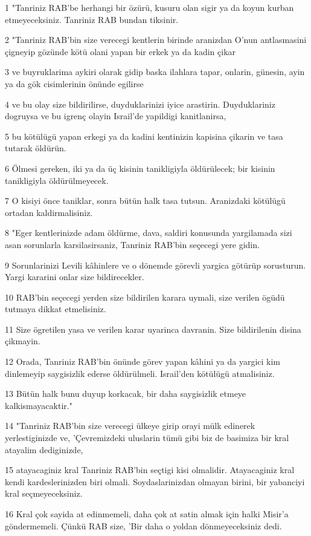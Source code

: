 \par 1 "Tanriniz RAB'be herhangi bir özürü, kusuru olan sigir ya da koyun kurban etmeyeceksiniz. Tanriniz RAB bundan tiksinir.
\par 2 "Tanriniz RAB'bin size verecegi kentlerin birinde aranizdan O'nun antlasmasini çigneyip gözünde kötü olani yapan bir erkek ya da kadin çikar
\par 3 ve buyruklarima aykiri olarak gidip baska ilahlara tapar, onlarin, günesin, ayin ya da gök cisimlerinin önünde egilirse
\par 4 ve bu olay size bildirilirse, duyduklarinizi iyice arastirin. Duyduklariniz dogruysa ve bu igrenç olayin Israil'de yapildigi kanitlanirsa,
\par 5 bu kötülügü yapan erkegi ya da kadini kentinizin kapisina çikarin ve tasa tutarak öldürün.
\par 6 Ölmesi gereken, iki ya da üç kisinin tanikligiyla öldürülecek; bir kisinin tanikligiyla öldürülmeyecek.
\par 7 O kisiyi önce taniklar, sonra bütün halk tasa tutsun. Aranizdaki kötülügü ortadan kaldirmalisiniz.
\par 8 "Eger kentlerinizde adam öldürme, dava, saldiri konusunda yargilamada sizi asan sorunlarla karsilasirsaniz, Tanriniz RAB'bin seçecegi yere gidin.
\par 9 Sorunlarinizi Levili kâhinlere ve o dönemde görevli yargica götürüp sorusturun. Yargi kararini onlar size bildirecekler.
\par 10 RAB'bin seçecegi yerden size bildirilen karara uymali, size verilen ögüdü tutmaya dikkat etmelisiniz.
\par 11 Size ögretilen yasa ve verilen karar uyarinca davranin. Size bildirilenin disina çikmayin.
\par 12 Orada, Tanriniz RAB'bin önünde görev yapan kâhini ya da yargici kim dinlemeyip saygisizlik ederse öldürülmeli. Israil'den kötülügü atmalisiniz.
\par 13 Bütün halk bunu duyup korkacak, bir daha saygisizlik etmeye kalkismayacaktir."
\par 14 "Tanriniz RAB'bin size verecegi ülkeye girip orayi mülk edinerek yerlestiginizde ve, 'Çevremizdeki uluslarin tümü gibi biz de basimiza bir kral atayalim dediginizde,
\par 15 atayacaginiz kral Tanriniz RAB'bin seçtigi kisi olmalidir. Atayacaginiz kral kendi kardeslerinizden biri olmali. Soydaslarinizdan olmayan birini, bir yabanciyi kral seçmeyeceksiniz.
\par 16 Kral çok sayida at edinmemeli, daha çok at satin almak için halki Misir'a göndermemeli. Çünkü RAB size, 'Bir daha o yoldan dönmeyeceksiniz dedi.
